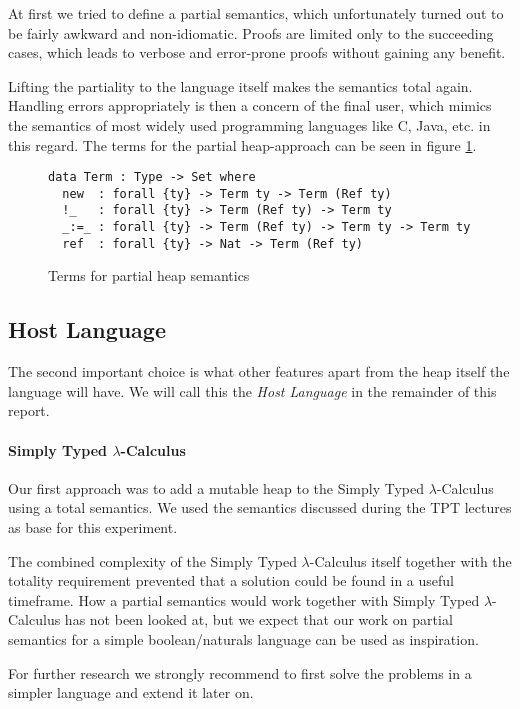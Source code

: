 \documentclass[12pt, a4paper, oneside]{article}
\begin{document}
At first we tried to define a partial semantics, which unfortunately turned out to be fairly awkward and non-idiomatic. Proofs are limited only to the succeeding cases, which leads to verbose and error-prone proofs without gaining any benefit. 

Lifting the partiality to the language itself makes the semantics total again.
Handling errors appropriately is then a concern of the final user, which mimics the semantics of most widely used programming languages like C, Java, etc. in this regard.
The terms for the partial heap-approach can be seen in figure \ref{lst:part-term}.

\begin{figure}
\begin{lstlisting}
data Term : Type -> Set where
  new  : forall {ty} -> Term ty -> Term (Ref ty)
  !_   : forall {ty} -> Term (Ref ty) -> Term ty
  _:=_ : forall {ty} -> Term (Ref ty) -> Term ty -> Term ty
  ref  : forall {ty} -> Nat -> Term (Ref ty)
\end{lstlisting}
\caption{Terms for partial heap semantics}
\label{lst:part-term}
\end{figure}


\subsection{Host Language}
The second important choice is what other features apart from the heap itself the language will have. We will call this the \emph{Host Language} in the remainder of this report.


\paragraph{Simply Typed $\lambda$-Calculus}
Our first approach was to add a mutable heap to the Simply Typed $\lambda$-Calculus using a total semantics. We used the semantics discussed during the TPT lectures
as base for this experiment.

The combined complexity of the Simply Typed $\lambda$-Calculus itself together with the totality requirement prevented that a solution could be found in a useful timeframe.
How a partial semantics would work together with Simply Typed $\lambda$-Calculus has not been looked at, but we expect that our work on partial semantics for a simple
boolean/naturals language can be used as inspiration.

For further research we strongly recommend to first solve the problems in a simpler language and extend it later on.
\end{document}
